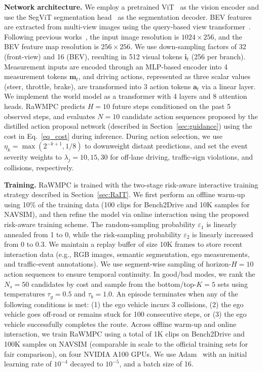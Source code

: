 \documentclass[twocolumn]{template}
\theoremstyle{thmstyleone}%
\theoremstyle{thmstyletwo}%
\theoremstyle{thmstylethree}%
\begin{document}
\textbf{Network architecture.} We employ a pretrained ViT~\cite{Dinov3} as the vision encoder and use the SegViT segmentation head~\cite{SegViT} as the segmentation decoder. BEV features are extracted from multi-view images using the query-based view transformer~\cite{Bevformer}. Following previous works~\cite{WoTE,Transfuser}, the input image resolution is $1024\times256$, and the BEV feature map resolution is $256\times256$. We use down-sampling factors of 32 (front-view) and 16 (BEV), resulting in 512 visual tokens $\mathbf{i}_{t}$ (256 per branch). Measurement inputs are encoded through an MLP-based encoder into 4 measurement tokens $\mathbf{m}_{t}$, and driving actions, represented as three scalar values (steer, throttle, brake), are transformed into 3 action tokens $\mathbf{a}_{t}$ via a linear layer. We implement the world model as a transformer with 4 layers and 8 attention heads. RaWMPC predicts $H{=}10$ future steps conditioned on the past 5 observed steps, and evaluates $N{=}10$ candidate action sequences proposed by the distilled action proposal network (described in Section~\ref{sec:guidance}) using the cost in Eq.~\eqref{eq_cost} during inference. During action selection, we use $\eta_k=\max(2^{-k+1},1/8)$ to downweight distant predictions, and set the event severity weights to $\lambda_j={10,15,30}$ for off-lane driving, traffic-sign violations, and collisions, respectively.

\noindent
\textbf{Training.} RaWMPC is trained with the two-stage risk-aware interactive training strategy described in Section~\ref{sec:RaIT}. We first perform an offline warm-up using 10\% of the training data (100 clips for Bench2Drive and 10K samples for NAVSIM), and then refine the model via online interaction using the proposed risk-aware training scheme. The random-sampling probability $\varepsilon_1$ is linearly annealed from 1 to 0, while the risk-sampling probability $\varepsilon_2$ is linearly increased from 0 to 0.3. We maintain a replay buffer of size 10K frames to store recent interaction data (e.g., RGB images, semantic segmentation, ego measurements, and traffic-event annotations).
We use segment-wise sampling of horizon-$H{=}10$ action sequences to ensure temporal continuity. In good/bad modes, we rank the $N_s{=}50$ candidates by cost and sample from the bottom/top-$K{=}5$ sets using temperatures $\tau_g=0.5$ and $\tau_b=1.0$.
An episode terminates when any of the following conditions is met: (1) the ego vehicle incurs 3 collisions, (2) the ego vehicle goes off-road or remains stuck for 100 consecutive steps, or (3) the ego vehicle successfully completes the route. Across offline warm-up and online interaction, we train RaWMPC using a total of 1K clips on Bench2Drive and 100K samples on NAVSIM (comparable in scale to the official training sets for fair comparison), on four NVIDIA A100 GPUs. We use Adam~\cite{Adam} with an initial learning rate of $10^{-4}$ decayed to $10^{-5}$, and a batch size of 16.
\end{document}
